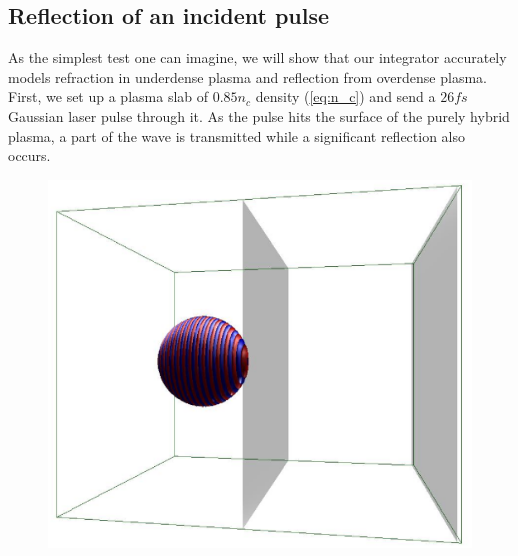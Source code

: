 \documentclass[conference]{IEEEtran}
\renewcommand{\~}{\widetilde }
\begin{document}
\subsection{Reflection of an incident pulse}
As the simplest test one can imagine, we will show that our integrator
accurately models refraction in underdense plasma and reflection from
overdense plasma. 
First, we set up a plasma slab of $0.85 n_c$ density
(\ref{eq:n_c}) 
and send a $26 fs$ Gaussian laser pulse through it.
As the pulse hits the surface of the purely hybrid plasma, a part of the wave
is transmitted while a significant reflection also occurs.  
\begin{figure}[H]
	\begin{minipage}{0.48\columnwidth}
		\begin{center}
			\includegraphics[width=1.0\columnwidth]{frame_disp000.ps}
		\end{center}
	\end{minipage}%
	\begin{minipage}{0.04\columnwidth}
		\hfill
	\end{minipage}%
	\begin{minipage}{0.48\columnwidth}
		\begin{center}

\end{center}
\end{minipage}
\end{figure}
\end{document}
